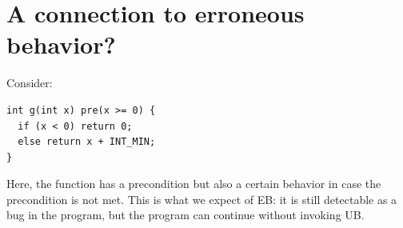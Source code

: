 \section{A connection to erroneous behavior?}

Consider:
\medskip\begin{lstlisting}[style=Vc]
int g(int x) pre(x >= 0) {
  if (x < 0) return 0;
  else return x + INT_MIN;
}
\end{lstlisting}

Here, the function has a precondition but also a certain behavior in case the precondition is not
met.
This is what we expect of EB\@: it is still detectable as a bug in the program, but the program can
continue without invoking UB\@.



